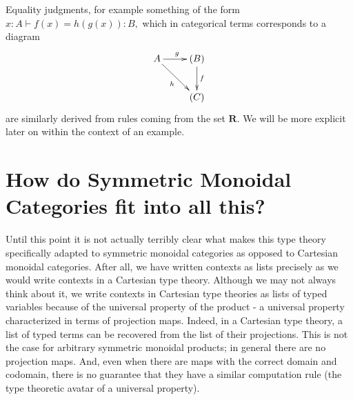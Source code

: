 \documentclass[pra,floatfix,
amsmath,superscriptaddress, 12pt]{article}
\theoremstyle{definition}
\begin{document}
Equality judgments, for example something of the form $x:A\vdash f\left(x\right)=h\left(g\left(x\right)\right):B,$ which in categorical terms corresponds to a diagram
%
\begin{eqnarray*}
    \vcenter{
                \vbox{
                    \xymatrix{
                        A
                        \ar[r]^{g}
                        \ar[dr]_{h}
                            &
                            (B)
                            \ar[d]^{f}
                                \\
                            &
                                (C)}}}
\end{eqnarray*}
%
%
are similarly derived from rules coming from the set $\mathbf{R}$. We will be more explicit later on within the context of an example.

\section{How do Symmetric Monoidal Categories fit into all this?}


Until this point it is not actually terribly clear what makes this type theory specifically adapted to symmetric monoidal categories as opposed to Cartesian monoidal categories. After all, we have written contexts as lists precisely as we would write contexts in a Cartesian type theory. 
%
%
Although we may not always think about it, we write contexts in Cartesian type theories as lists of typed variables because of the universal property of the product - a universal property characterized in terms of projection maps. Indeed, in a Cartesian type theory, a list of typed terms can be recovered from the list of their projections. This is not the case for arbitrary symmetric monoidal products; in general there are no projection maps. And, even when there are maps with the correct domain and codomain, there is no guarantee that they have a similar computation rule (the type theoretic avatar of a universal property).
\end{document}
